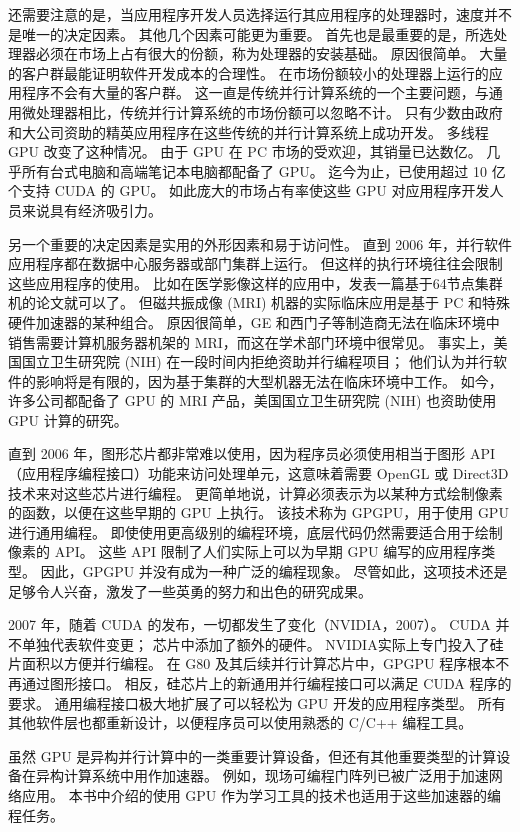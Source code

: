 还需要注意的是，当应用程序开发人员选择运行其应用程序的处理器时，速度并不是唯一的决定因素。 其他几个因素可能更为重要。 首先也是最重要的是，所选处理器必须在市场上占有很大的份额，称为处理器的安装基础。 原因很简单。 大量的客户群最能证明软件开发成本的合理性。 在市场份额较小的处理器上运行的应用程序不会有大量的客户群。 这一直是传统并行计算系统的一个主要问题，与通用微处理器相比，传统并行计算系统的市场份额可以忽略不计。 只有少数由政府和大公司资助的精英应用程序在这些传统的并行计算系统上成功开发。 多线程 GPU 改变了这种情况。 由于 GPU 在 PC 市场的受欢迎，其销量已达数亿。 几乎所有台式电脑和高端笔记本电脑都配备了 GPU。 迄今为止，已使用超过 10 亿个支持 CUDA 的 GPU。 如此庞大的市场占有率使这些 GPU 对应用程序开发人员来说具有经济吸引力。

另一个重要的决定因素是实用的外形因素和易于访问性。 直到 2006 年，并行软件应用程序都在数据中心服务器或部门集群上运行。 但这样的执行环境往往会限制这些应用程序的使用。 比如在医学影像这样的应用中，发表一篇基于64节点集群机的论文就可以了。 但磁共振成像 (MRI) 机器的实际临床应用是基于 PC 和特殊硬件加速器的某种组合。 原因很简单，GE 和西门子等制造商无法在临床环境中销售需要计算机服务器机架的 MRI，而这在学术部门环境中很常见。 事实上，美国国立卫生研究院 (NIH) 在一段时间内拒绝资助并行编程项目； 他们认为并行软件的影响将是有限的，因为基于集群的大型机器无法在临床环境中工作。 如今，许多公司都配备了 GPU 的 MRI 产品，美国国立卫生研究院 (NIH) 也资助使用 GPU 计算的研究。

直到 2006 年，图形芯片都非常难以使用，因为程序员必须使用相当于图形 API（应用程序编程接口）功能来访问处理单元，这意味着需要 OpenGL 或 Direct3D 技术来对这些芯片进行编程。 更简单地说，计算必须表示为以某种方式绘制像素的函数，以便在这些早期的 GPU 上执行。 该技术称为 GPGPU，用于使用 GPU 进行通用编程。 即使使用更高级别的编程环境，底层代码仍然需要适合用于绘制像素的 API。 这些 API 限制了人们实际上可以为早期 GPU 编写的应用程序类型。 因此，GPGPU 并没有成为一种广泛的编程现象。 尽管如此，这项技术还是足够令人兴奋，激发了一些英勇的努力和出色的研究成果。

2007 年，随着 CUDA 的发布，一切都发生了变化（NVIDIA，2007）。 CUDA 并不单独代表软件变更； 芯片中添加了额外的硬件。 NVIDIA实际上专门投入了硅片面积以方便并行编程。 在 G80 及其后续并行计算芯片中，GPGPU 程序根本不再通过图形接口。 相反，硅芯片上的新通用并行编程接口可以满足 CUDA 程序的要求。 通用编程接口极大地扩展了可以轻松为 GPU 开发的应用程序类型。 所有其他软件层也都重新设计，以便程序员可以使用熟悉的 C/C++ 编程工具。

虽然 GPU 是异构并行计算中的一类重要计算设备，但还有其他重要类型的计算设备在异构计算系统中用作加速器。 例如，现场可编程门阵列已被广泛用于加速网络应用。 本书中介绍的使用 GPU 作为学习工具的技术也适用于这些加速器的编程任务。


